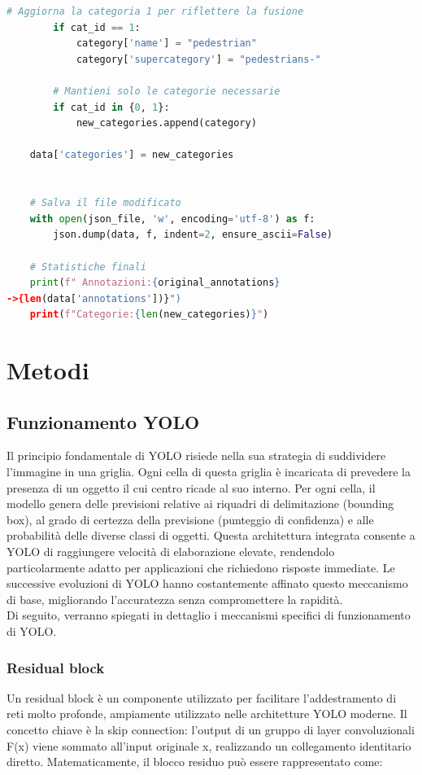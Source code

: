 \documentclass[12pt]{article}
\begin{document}
\begin{lstlisting}[language=Python, caption={Esempio di codice per il remapping del formato COCO JSON}, label={lst:remapping-coco}]
        # Aggiorna la categoria 1 per riflettere la fusione
        if cat_id == 1:
            category['name'] = "pedestrian"
            category['supercategory'] = "pedestrians-"
        
        # Mantieni solo le categorie necessarie
        if cat_id in {0, 1}:
            new_categories.append(category)
    
    data['categories'] = new_categories
    
    
    # Salva il file modificato
    with open(json_file, 'w', encoding='utf-8') as f:
        json.dump(data, f, indent=2, ensure_ascii=False)
    
    # Statistiche finali
    print(f" Annotazioni:{original_annotations}
->{len(data['annotations'])}")
    print(f"Categorie:{len(new_categories)}")
\end{lstlisting}

\section{Metodi}
\subsection{Funzionamento YOLO}
Il principio fondamentale di YOLO risiede nella sua strategia di suddividere l'immagine in una griglia. Ogni cella di questa griglia è incaricata di prevedere la presenza di un oggetto il cui centro ricade al suo interno. Per ogni cella, il modello genera delle previsioni relative ai riquadri di delimitazione (bounding box), al grado di certezza della previsione (punteggio di confidenza) e alle probabilità delle diverse classi di oggetti. Questa architettura integrata consente a YOLO di raggiungere velocità di elaborazione elevate, rendendolo particolarmente adatto per applicazioni che richiedono risposte immediate. Le successive evoluzioni di YOLO hanno costantemente affinato questo meccanismo di base, migliorando l'accuratezza senza compromettere la rapidità.\\
Di seguito, verranno spiegati in dettaglio i meccanismi specifici di funzionamento di YOLO.

\subsubsection{Residual block} 
Un residual block è un componente utilizzato per facilitare l’addestramento di reti molto profonde, ampiamente utilizzato nelle architetture YOLO moderne. Il concetto chiave è la skip connection: l’output di un gruppo di layer convoluzionali F(x) viene sommato all’input originale x, realizzando un collegamento identitario diretto. Matematicamente, il blocco residuo può essere rappresentato come: 
\end{document}
